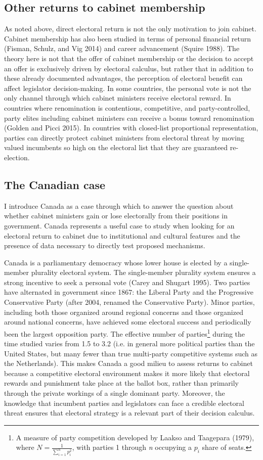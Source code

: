 \documentclass[letter,12pt]{article}
\begin{document}
\subsection*{Other returns to cabinet membership}
As noted above, direct electoral return is not the only motivation to join cabinet. Cabinet membership has also been studied in terms of personal financial return (Fisman, Schulz, and Vig 2014) and career advancement (Squire 1988). The theory here is not that the offer of cabinet membership or the decision to accept an offer is exclusively driven by electoral calculus, but rather that in addition to these already documented advantages, the perception of electoral benefit can affect legislator decision-making. In some countries, the personal vote is not the only channel through which cabinet ministers receive electoral reward. In countries where renomination is contentious, competitive, and party-controlled, party elites including cabinet ministers can receive a bonus toward renomination (Golden and Picci 2015). In countries with closed-list proportional representation, parties can directly protect cabinet ministers from electoral threat by moving valued incumbents so high on the electoral list that they are guaranteed re-election.

\subsection*{The Canadian case}
I introduce Canada as a case through which to answer the question about whether cabinet ministers gain or lose electorally from their positions in government. Canada represents a useful case to study when looking for an electoral return to cabinet due to institutional and cultural features and the presence of data necessary to directly test proposed mechanisms. 

Canada is a parliamentary democracy whose lower house is elected by a single-member plurality electoral system. The single-member plurality system ensures a strong incentive to seek a personal vote (Carey and Shugart 1995). Two parties have alternated in government since 1867: the Liberal Party and the Progressive Conservative Party (after 2004, renamed the Conservative Party). Minor parties, including both those organized around regional concerns and those organized around national concerns, have achieved some electoral success and periodically been the largest opposition party. The effective number of parties\footnote{A measure of party competition developed by Laakso and Taagepara (1979), where $N = \frac{1}{\sum_{i=1}^n p_i^2}$, with parties 1 through \textit{n} occupying a $p_i$ share of seats.} during the time studied varies from 1.5 to 3.2 (i.e. in general more political parties than the United States, but many fewer than true multi-party competitive systems such as the Netherlands). This makes Canada a good milieu to assess returns to cabinet because a competitive electoral environment makes it more likely that electoral rewards and punishment take place at the ballot box, rather than primarily through the private workings of a single dominant party. Moreover, the knowledge that incumbent parties and legislators can face a credible electoral threat ensures that electoral strategy is a relevant part of their decision calculus.
\end{document}
